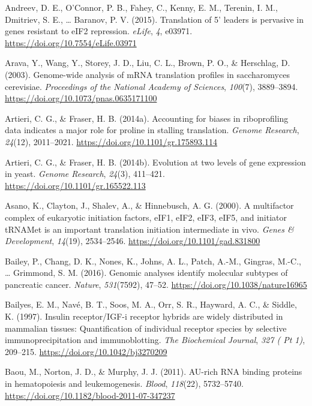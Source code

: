 \documentclass[12pt,openany]{book}
\begin{document}
\hypertarget{ref-Andreev2015}{}
Andreev, D. E., O'Connor, P. B., Fahey, C., Kenny, E. M., Terenin, I.
M., Dmitriev, S. E., \ldots{} Baranov, P. V. (2015). Translation of 5'
leaders is pervasive in genes resistant to eIF2 repression.
\emph{eLife}, \emph{4}, e03971.
\url{https://doi.org/10.7554/eLife.03971}

\hypertarget{ref-Arava2003}{}
Arava, Y., Wang, Y., Storey, J. D., Liu, C. L., Brown, P. O., \&
Herschlag, D. (2003). Genome-wide analysis of mRNA translation profiles
in saccharomyces cerevisiae. \emph{Proceedings of the National Academy
of Sciences}, \emph{100}(7), 3889--3894.
\url{https://doi.org/10.1073/pnas.0635171100}

\hypertarget{ref-Artieri2014a}{}
Artieri, C. G., \& Fraser, H. B. (2014a). Accounting for biases in
riboprofiling data indicates a major role for proline in stalling
translation. \emph{Genome Research}, \emph{24}(12), 2011--2021.
\url{https://doi.org/10.1101/gr.175893.114}

\hypertarget{ref-Artieri2014}{}
Artieri, C. G., \& Fraser, H. B. (2014b). Evolution at two levels of
gene expression in yeast. \emph{Genome Research}, \emph{24}(3),
411--421. \url{https://doi.org/10.1101/gr.165522.113}

\hypertarget{ref-Asano2000}{}
Asano, K., Clayton, J., Shalev, A., \& Hinnebusch, A. G. (2000). A
multifactor complex of eukaryotic initiation factors, eIF1, eIF2, eIF3,
eIF5, and initiator tRNAMet is an important translation initiation
intermediate in vivo. \emph{Genes \& Development}, \emph{14}(19),
2534--2546. \url{https://doi.org/10.1101/gad.831800}

\hypertarget{ref-Bailey2016}{}
Bailey, P., Chang, D. K., Nones, K., Johns, A. L., Patch, A.-M.,
Gingras, M.-C., \ldots{} Grimmond, S. M. (2016). Genomic analyses
identify molecular subtypes of pancreatic cancer. \emph{Nature},
\emph{531}(7592), 47--52. \url{https://doi.org/10.1038/nature16965}

\hypertarget{ref-Bailyes1997}{}
Bailyes, E. M., Navé, B. T., Soos, M. A., Orr, S. R., Hayward, A. C., \&
Siddle, K. (1997). Insulin receptor/IGF-i receptor hybrids are widely
distributed in mammalian tissues: Quantification of individual receptor
species by selective immunoprecipitation and immunoblotting. \emph{The
Biochemical Journal}, \emph{327 ( Pt 1)}, 209--215.
\url{https://doi.org/10.1042/bj3270209}

\hypertarget{ref-Baou2011}{}
Baou, M., Norton, J. D., \& Murphy, J. J. (2011). AU-rich RNA binding
proteins in hematopoiesis and leukemogenesis. \emph{Blood},
\emph{118}(22), 5732--5740.
\url{https://doi.org/10.1182/blood-2011-07-347237}
\end{document}
